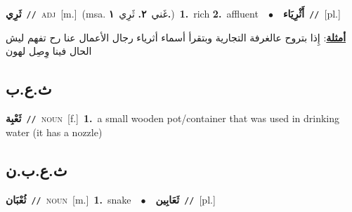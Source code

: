 \documentclass[10pt,a4paper,twoside]{article} %
\begin{document}
\begin{multicols}{2}
{{{{\setlength\topsep{0pt}\textbf{\foreignlanguage{arabic}{ثَرِي}}\ {\color{gray}\texttt{//}\color{black}}\ \textsc{adj}\ [m.]\ \color{gray}(msa. \foreignlanguage{arabic}{غَني}~\foreignlanguage{arabic}{\textbf{٢.}}  \foreignlanguage{arabic}{ثَرِي}~\foreignlanguage{arabic}{\textbf{١.}})\color{black}\ \textbf{1.}~rich  \textbf{2.}~affluent\ \ $\bullet$\ \ \setlength\topsep{0pt}\textbf{\foreignlanguage{arabic}{أَثْرِيَاء}}\ {\color{gray}\texttt{//}\color{black}}\ [pl.]\  \begin{flushright}\color{gray}\foreignlanguage{arabic}{\textbf{\underline{\foreignlanguage{arabic}{أمثلة}}}: إِذا بتروح عالغرفة التجارية وبتقرأ أسماء أثرياء رجال الأعمال عنا رح تفهم ليش الحال فينا وِصِل لهون}\end{flushright}\color{black}} \vspace{2mm}

\vspace{-3mm}
\subsection*{\color{blue}\foreignlanguage{arabic}{ث.ع.ب}\color{blue}{}} 

{\setlength\topsep{0pt}\textbf{\foreignlanguage{arabic}{ثَعْبِة}}\ {\color{gray}\texttt{//}\color{black}}\ \textsc{noun}\ [f.]\ \textbf{1.}~a small wooden pot/container that was used in drinking water (it has a nozzle)\ 

\vspace{-3mm}
\subsection*{\color{blue}\foreignlanguage{arabic}{ث.ع.ب.ن}\color{blue}{ (ntws)}} 

{\setlength\topsep{0pt}\textbf{\foreignlanguage{arabic}{ثُعْبَان}}\ {\color{gray}\texttt{//}\color{black}}\ \textsc{noun}\ [m.]\ \textbf{1.}~snake\ \ $\bullet$\ \ \setlength\topsep{0pt}\textbf{\foreignlanguage{arabic}{ثَعَابِين}}\ {\color{gray}\texttt{//}\color{black}}\ [pl.]\ 

}}}}}
\end{multicols}
\end{document}
